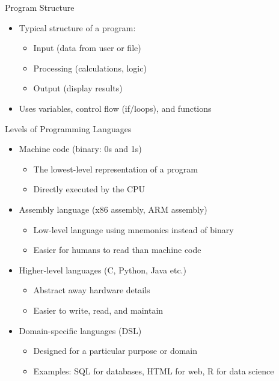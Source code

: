 \documentclass[12pt, aspectratio=169]{beamer}
\begin{document}
    \begin{frame}{Program Structure}
        \begin{itemize}
            \item Typical structure of a program:
            \begin{itemize}
                \item Input (data from user or file)
                \item Processing (calculations, logic)
                \item Output (display results)
            \end{itemize}
            \item Uses variables, control flow (if/loops), and functions
        \end{itemize}
    \end{frame}


    \begin{frame}{Levels of Programming Languages}
        \begin{itemize}
            \item Machine code (binary: 0s and 1s)
            \begin{itemize}
                \item The lowest-level representation of a program
                \item Directly executed by the CPU
            \end{itemize}
            
            \item Assembly language (x86 assembly, ARM assembly)
            \begin{itemize}
                \item Low-level language using mnemonics instead of binary
                \item Easier for humans to read than machine code
            \end{itemize}

            \item Higher-level languages (C, Python, Java etc.)
            \begin{itemize} 
                \item Abstract away hardware details
                \item Easier to write, read, and maintain
            \end{itemize}

            \item Domain-specific languages (DSL)
            \begin{itemize}
                \item Designed for a particular purpose or domain
                \item Examples: SQL for databases, HTML for web, R for data science
            \end{itemize}
        \end{itemize}
    \end{frame}
\end{document}
